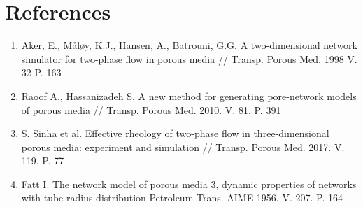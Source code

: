 \documentclass[12pt]{article}
\begin{document}
\section{References}
	\begin{enumerate}
		\item Aker, E., Måløy, K.J., Hansen, A., Batrouni, G.G. A two-dimensional network simulator for two-phase flow in porous media // Transp. Porous Med. 1998 V. 32 P. 163 
		\item Raoof A., Hassanizadeh S. A new method for generating pore-network models of porous media // Transp. Porous Med. 2010. V. 81. P. 391
		\item S. Sinha et al. Effective rheology of two-phase flow in three-dimensional porous media: experiment and simulation // Transp. Porous Med. 2017. V. 119. P. 77
		\item Fatt I. The network model of porous media 3, dynamic properties of networks with tube radius distribution Petroleum Trans. AIME 1956. V. 207. P. 164
	\end{enumerate}
\end{document}
